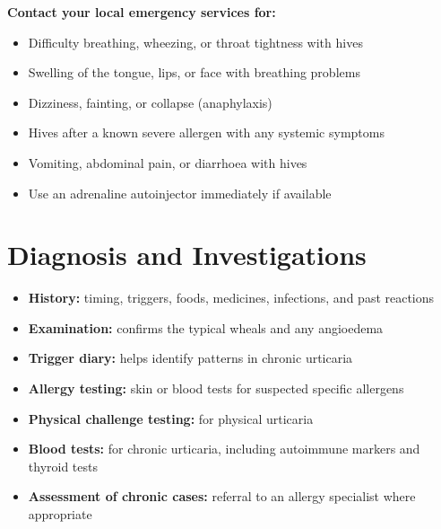 \textbf{Contact your local emergency services for:}
\begin{itemize}
    \item Difficulty breathing, wheezing, or throat tightness with hives
    \item Swelling of the tongue, lips, or face with breathing problems
    \item Dizziness, fainting, or collapse (anaphylaxis)
    \item Hives after a known severe allergen with any systemic symptoms
    \item Vomiting, abdominal pain, or diarrhoea with hives
    \item Use an adrenaline autoinjector immediately if available
\end{itemize}

\section*{Diagnosis and Investigations}
\begin{itemize}
    \item \textbf{History:} timing, triggers, foods, medicines, infections, and past reactions
    \item \textbf{Examination:} confirms the typical wheals and any angioedema
    \item \textbf{Trigger diary:} helps identify patterns in chronic urticaria
    \item \textbf{Allergy testing:} skin or blood tests for suspected specific allergens
    \item \textbf{Physical challenge testing:} for physical urticaria
    \item \textbf{Blood tests:} for chronic urticaria, including autoimmune markers and thyroid tests
    \item \textbf{Assessment of chronic cases:} referral to an allergy specialist where appropriate
\end{itemize}


